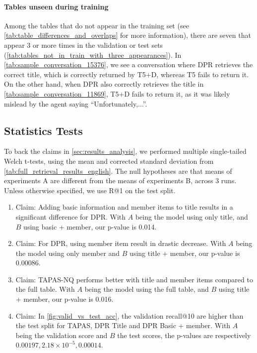 \documentclass[11pt]{article}
\begin{document}
\paragraph{Tables unseen during training} Among the tables that do not appear in the training set (see \autoref{tab:table_differences_and_overlaps} for more information), there are seven that appear 3 or more times in the validation or test sets (\autoref{tab:tables_not_in_train_with_three_appearances}). In \autoref{tab:sample_conversation_15376}, we see a conversation where DPR retrieves the correct title, which is correctly returned by T5+D, whereas T5 fails to return it. On the other hand, when DPR also correctly retrieves the title in \autoref{tab:sample_conversation_11869}, T5+D fails to return it, as it was likely mislead by the agent saying ``Unfortunately,...''.

\subsection{Statistics Tests}
\label{sec:appendix_stats_tests}

To back the claims in \autoref{sec:results_analysis}, we performed multiple single-tailed Welch t-tests, using the mean and corrected standard deviation from \ref{tab:full_retrieval_results_english}. The null hypotheses are that means of experiments A are different from the means of experiments B, across 3 runs. Unless otherwise specified, we use R@1 on the test split.

\begin{enumerate}
    \item Claim: Adding basic information and member items to title results in a significant difference for DPR. With $A$ being the model using only title, and $B$ using basic + member, our p-value is 0.014.
    \item Claim: For DPR, using member item result in drastic decrease. With $A$ being the model using only member and $B$ using title + member, our p-value is 0.00086.
    \item Claim: TAPAS-NQ performs better with title and member items compared to the full table. With $A$ being the model using the full table, and $B$ using title + member, our p-value is 0.016.
    \item Claim: In \autoref{fig:valid_vs_test_acc}, the validation recall@10 are higher than the test split for TAPAS, DPR Title and DPR Basic + member. With $A$ being the validation score and $B$ the test scores, the p-values are respectively $0.00197, 2.18 \times 10^{-5}, 0.00014$.
\end{enumerate}
\end{document}
